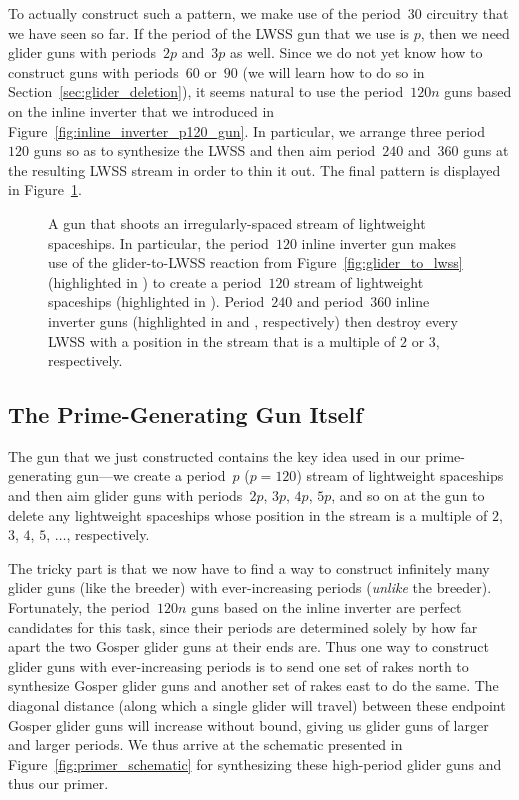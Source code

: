 To actually construct such a pattern, we make use of the period~$30$ circuitry that we have seen so far. If the period of the LWSS gun that we use is $p$, then we need glider guns with periods~$2p$ and~$3p$ as well. Since we do not yet know how to construct guns with periods~$60$ or~$90$ (we will learn how to do so in Section~\ref{sec:glider_deletion}), it seems natural to use the period~$120n$ guns based on the inline inverter that we introduced in Figure~\ref{fig:inline_inverter_p120_gun}. In particular, we arrange three period~$120$ guns so as to synthesize the LWSS and then aim period~$240$ and~$360$ guns at the resulting LWSS stream in order to thin it out. The final pattern is displayed in Figure~\ref{fig:period_not_2_3_lwss_gun}.

\begin{figure}[!htb]
	\centering
	\caption{A gun that shoots an irregularly-spaced stream of lightweight spaceships. In particular, the period~$120$ inline inverter gun makes use of the glider-to-LWSS reaction from Figure~\ref{fig:glider_to_lwss} (highlighted in ) to create a period~$120$ stream of lightweight spaceships (highlighted in ). Period~$240$ and period~$360$ inline inverter guns (highlighted in  and , respectively) then destroy every LWSS with a position in the stream that is a multiple of $2$ or $3$, respectively.}
	\label{fig:period_not_2_3_lwss_gun}
\end{figure}


\subsection{The Prime-Generating Gun Itself}\label{sec:primer_itself}

The gun that we just constructed contains the key idea used in our prime-generating gun---we create a period~$p$ ($p = 120$) stream of lightweight spaceships and then aim glider guns with periods~$2p$, $3p$, $4p$, $5p$, and so on at the gun to delete any lightweight spaceships whose position in the stream is a multiple of $2$, $3$, $4$, $5$, $\ldots$, respectively.

The tricky part is that we now have to find a way to construct infinitely many glider guns (like the breeder) with ever-increasing periods (\emph{unlike} the breeder). Fortunately, the period~$120n$ guns based on the inline inverter are perfect candidates for this task, since their periods are determined solely by how far apart the two Gosper glider guns at their ends are. Thus one way to construct glider guns with ever-increasing periods is to send one set of rakes north to synthesize Gosper glider guns and another set of rakes east to do the same. The diagonal distance (along which a single glider will travel) between these endpoint Gosper glider guns will increase without bound, giving us glider guns of larger and larger periods. We thus arrive at the schematic presented in Figure~\ref{fig:primer_schematic} for synthesizing these high-period glider guns and thus our primer.

